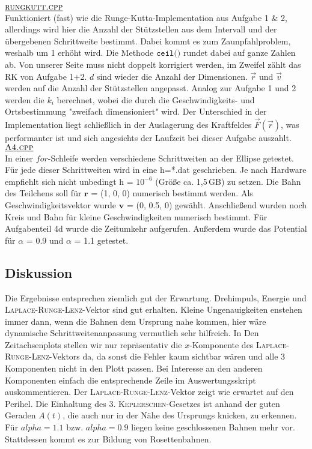 	
	$\underline{\textsc{rungkutt.cpp}}$ \\
 Funktioniert (fast) wie die Runge-Kutta-Implementation aus Aufgabe 1 \& 2, allerdings wird hier die Anzahl der Stützstellen aus dem Intervall und der übergebenen Schrittweite bestimmt. Dabei kommt es zum Zaunpfahlproblem\cite{zaun}, weshalb um 1 erhöht wird. Die Methode $\texttt{ceil()}$ rundet dabei auf ganze Zahlen ab. Von unserer Seite muss nicht doppelt korrigiert werden, im Zweifel zählt das RK von Aufgabe 1+2. $d$ sind wieder die Anzahl der Dimensionen. $\vec{r}$ und $\vec{v}$ werden auf die Anzahl der Stützstellen angepasst. Analog zur Aufgabe 1 und 2 werden die $k_i$ berechnet, wobei die durch die Geschwindigkeits- und Ortsbestimmung "zweifach dimensioniert" wird. Der Unterschied in der Implementation liegt schließlich in der Auslagerung des Kraftfeldes $\vec{F}(\vec{r})$, was performanter ist und sich angesichts der Laufzeit bei dieser Aufgabe auszahlt.\\	
	
	$\underline{\textsc{A4.cpp}}$ \\
In einer $\textit{for}$-Schleife werden verschiedene Schrittweiten an der Ellipse getestet. Für jede dieser Schrittweiten wird in eine h=*.dat geschrieben. Je nach Hardware empfiehlt sich nicht unbedingt h = $10^{-6}$ (Größe ca. 1,5$\,$GB) zu setzen. Die Bahn des Teilchens soll für $\textbf{r}$ = (1, 0, 0) numerisch bestimmt werden. Als Geschwindigkeitsvektor wurde $\textbf{v}$ = (0, 0.5, 0) gewählt. Anschließend wurden noch Kreis und Bahn für kleine Geschwindigkeiten numerisch bestimmt. Für Aufgabenteil 4d wurde die Zeitumkehr aufgerufen. Außerdem wurde das Potential für $\alpha$ = 0.9 und $\alpha$ = 1.1 getestet.

\subsection*{Diskussion}
Die Ergebnisse entsprechen ziemlich gut der Erwartung. Drehimpuls, Energie und
\textsc{Laplace-Runge-Lenz}-Vektor sind gut erhalten. Kleine Ungenauigkeiten enstehen immer dann,
wenn die Bahnen dem Ursprung nahe kommen, hier wäre dynamische Schrittweitenanpassung vermutlich
sehr hilfreich. In Den Zeitachsenplots stellen wir nur repräsentativ die $x$-Komponente des
\textsc{Laplace-Runge-Lenz}-Vektors da, da sonst die Fehler kaum sichtbar wären und alle 3
Komponenten nicht in den Plott passen. Bei Interesse an den anderen Komponenten einfach die
entsprechende Zeile im Auswertungsskript auskommentieren. Der \textsc{Laplace-Runge-Lenz}-Vektor
zeigt wie erwartet auf den Perihel. Die Einhaltung des 3. \textsc{Keplerschen}-Gesetzes ist anhand
der guten Geraden $A(t)$, die auch nur in der Nähe des Ursprungs knicken, zu erkennen. 
Für $alpha = 1.1$ bzw. $alpha = 0.9$ liegen keine geschlossenen Bahnen mehr vor. Stattdessen kommt
es zur Bildung von Rosettenbahnen.

\printbibliography

